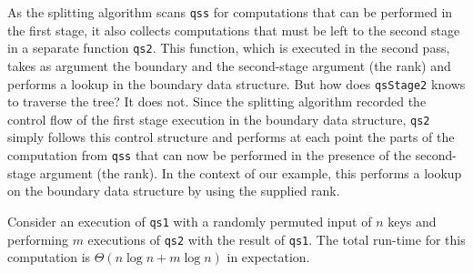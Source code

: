 \begin{abstrsyn}
As the splitting algorithm scans \texttt{qss} for computations that
can be performed in the first stage, it also collects computations
that must be left to the second stage in a separate function
\texttt{qs2}.  This function, which is executed in the second pass,
takes as argument the boundary and the second-stage argument (the
rank) and performs a lookup in the boundary data structure.  But how
does \texttt{qsStage2} knows to traverse the tree? It does not. Since
the splitting algorithm recorded the control flow of the first stage
execution in the boundary data structure, \texttt{qs2} simply follows
this control structure and performs at each point the parts of the
computation from \texttt{qss} that can now be performed in the
presence of the second-stage argument (the rank).  In the context of
our example, this performs a lookup on the boundary data structure by
using the supplied rank.

\begin{theorem}
  Consider an execution of \texttt{qs1} with a randomly permuted input
  of $n$ keys and performing $m$ executions of \texttt{qs2} with the
  result of \texttt{qs1}.  The total run-time for this computation is
  $\Theta(n\log{n} + m\log{n})$ in expectation.
\end{theorem}


\begin{comment}

An astute programmer, having noticed that \texttt{quickselect} can be staged in
this fashion, might try to split it into a pair of functions, one which performs
all the work depending only on \texttt{l} (the first stage), and one which uses
that partial result and \texttt{k} to compute the element with
rank \texttt{k} in \texttt{l}. 

Intuitively, \texttt{l} determines the result of all calls to
\texttt{part}ition, and \texttt{k} only determines which calls are made. So we
can preprocess \texttt{l} by recursively dividing it into halves smaller and
greater than the pivot---that is, building a binary search tree. Then, once we
have \texttt{k}, we can recur on this tree, choosing whichever branch has the
\texttt{k}${}^\textit{th}$ leftmost element until we reach a leaf. And because
\texttt{part}ition contains no second-stage code, we can run it entirely in the
first stage.

We have implemented this splitting of quickselect in \ref{fig:qs-split}.
\texttt{qSelect1} builds a binary search tree from the list \texttt{l}, and
\texttt{qSelect2} takes such a tree and a rank \texttt{k} and computes the
answer. This allows us to efficiently perform many order statistics queries on
\texttt{l} by caching the tree and reusing it for many different ranks
$\mathtt{k_1},\dots,\mathtt{k_m}$:
%
\begin{lstlisting}
let b = qSelect1 l in
  qSelect2 b @$k_1$@
  qSelect2 b @$k_2$@
   @$\vdots$@ 
  qSelect2 b @$k_m$@.
\end{lstlisting}


\end{comment}
\end{abstrsyn}
